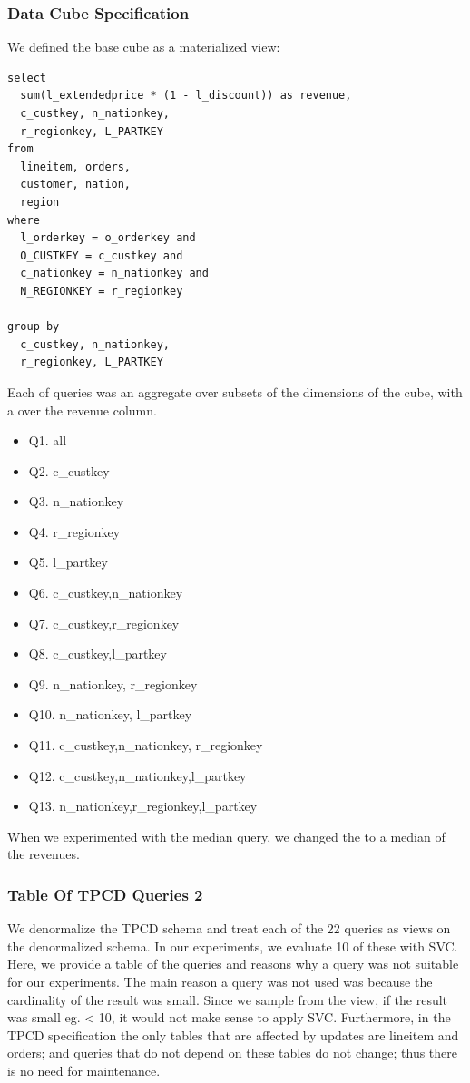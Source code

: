 \subsubsection{Data Cube Specification}
We defined the base cube as a materialized view:
\begin{lstlisting}
select
  sum(l_extendedprice * (1 - l_discount)) as revenue,
  c_custkey, n_nationkey,
  r_regionkey, L_PARTKEY
from
  lineitem, orders,
  customer, nation,
  region
where
  l_orderkey = o_orderkey and
  O_CUSTKEY = c_custkey and
  c_nationkey = n_nationkey and
  N_REGIONKEY = r_regionkey

group by
  c_custkey, n_nationkey, 
  r_regionkey, L_PARTKEY
\end{lstlisting}

Each of queries was an aggregate over subsets of the dimensions of the cube, 
with a \sumfunc over the revenue column.
\begin{itemize}
\item Q1. all
\item Q2. c\_custkey
\item Q3. n\_nationkey
\item Q4. r\_regionkey
\item Q5. l\_partkey
\item Q6. c\_custkey,n\_nationkey
\item Q7. c\_custkey,r\_regionkey
\item Q8. c\_custkey,l\_partkey
\item Q9. n\_nationkey, r\_regionkey
\item Q10. n\_nationkey, l\_partkey
\item Q11. c\_custkey,n\_nationkey, r\_regionkey
\item Q12. c\_custkey,n\_nationkey,l\_partkey
\item Q13. n\_nationkey,r\_regionkey,l\_partkey
\end{itemize}

When we experimented with the median query, we changed the \sumfunc to a median of the revenues.

\subsubsection{Table Of TPCD Queries 2}
We denormalize the TPCD schema and treat each of the 22 queries as views on the denormalized schema.
In our experiments, we evaluate 10 of these with SVC. 
Here, we provide a table of the queries and reasons why a query was not suitable for our experiments.
The main reason a query was not used was because the cardinality of the result was small.
Since we sample from the view, if the result was small eg. < 10, it would not make sense to apply SVC.
Furthermore, in the TPCD specification the only tables that are affected by updates are lineitem and orders; and queries that
do not depend on these tables do not change; thus there is no need for maintenance.

